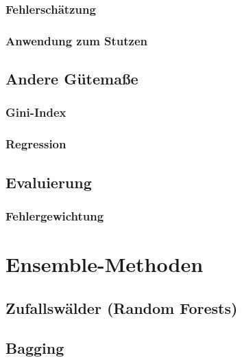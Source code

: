 		\subsection{Fehlerschätzung} %

		\subsection{Anwendung zum Stutzen} %

	\section{Andere Gütemaße} %

		\subsection{Gini-Index} %

		\subsection{Regression} %

	\section{Evaluierung} %

		\subsection{Fehlergewichtung} %

\chapter{Ensemble-Methoden} %

	\section{Zufallswälder (Random Forests)} %

	\section{Bagging} %

